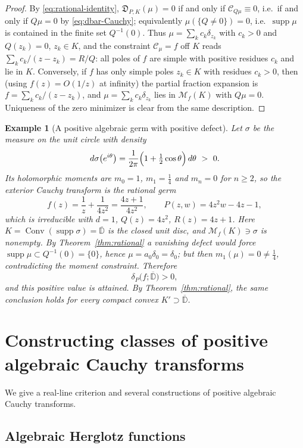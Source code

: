 \documentclass[10pt,a4paper]{amsart}
\newtheorem{example}[theorem]{Example}
\newcommand{\M}{\mathcal M}
\newcommand{\Cauchy}{\mathcal C}
\newcommand{\supp}{\operatorname{supp}}
\newcommand{\Conv}{\operatorname{Conv}}
\newcommand{\Db}{\mathbb D}
\begin{document}
\begin{proof}
By \eqref{eq:rational-identity}, $\mathfrak D_{P,K}(\mu)=0$ if and only if
$\Cauchy_{Q\mu}\equiv0$, i.e.\ if and only if $Q\mu=0$ by
\eqref{eq:dbar-Cauchy}; equivalently $\mu(\{Q\neq0\})=0$, i.e.\ $\supp\mu$ is
contained in the finite set $Q^{-1}(0)$.  Thus $\mu=\sum_kc_k\delta_{z_k}$ with
$c_k>0$ and $Q(z_k)=0$, $z_k\in K$, and the constraint $\Cauchy_\mu=f$ off $K$
reads $\sum_kc_k/(z-z_k)=R/Q$: all poles of $f$ are simple with positive
residues $c_k$ and lie in $K$.  Conversely, if $f$ has only simple poles $z_k\in
K$ with residues $c_k>0$, then (using $f(z)=O(1/z)$ at infinity) the partial
fraction expansion is $f=\sum_kc_k/(z-z_k)$, and $\mu=\sum_kc_k\delta_{z_k}$
lies in $\M_f(K)$ with $Q\mu=0$.  Uniqueness of the zero minimizer is clear from
the same description.
\end{proof}

\begin{example}[A positive algebraic germ with positive defect]
\label{ex:positive-defect}
Let $\sigma$ be the measure on the unit circle with density
\[
 d\sigma\bigl(e^{i\theta}\bigr)
 =\frac{1}{2\pi}\Bigl(1+\tfrac12\cos\theta\Bigr)\,d\theta\ >\ 0 .
\]
Its holomorphic moments are $m_0=1$, $m_1=\tfrac14$ and $m_n=0$ for $n\geq2$,
so the exterior Cauchy transform is the rational germ
\[
 f(z)=\frac1z+\frac{1}{4z^{2}}=\frac{4z+1}{4z^{2}} ,
 \qquad
 P(z,w)=4z^{2}w-4z-1 ,
\]
which is irreducible with $d=1$, $Q(z)=4z^2$, $R(z)=4z+1$.  Here
$K=\Conv(\supp\sigma)=\overline{\Db}$ is the closed unit disc, and
$\M_f(K)\ni\sigma$ is nonempty.  By Theorem~\ref{thm:rational} a vanishing
defect would force $\supp\mu\subset Q^{-1}(0)=\{0\}$, hence $\mu=a_0\delta_0=
\delta_0$; but then $m_1(\mu)=0\neq\tfrac14$, contradicting the moment
constraint.  Therefore
\[
 \delta_P\bigl(f;\overline{\Db}\bigr)>0 ,
\]
and this positive value is attained.  By Theorem~\ref{thm:rational}, the same
conclusion holds for every compact convex $K'\supset\overline{\Db}$.
\end{example}


\section{Constructing classes of positive algebraic Cauchy transforms}
\label{sec:constructive}

We give a real-line criterion and several constructions of positive algebraic
Cauchy transforms.

\subsection{Algebraic Herglotz functions}
\end{document}
